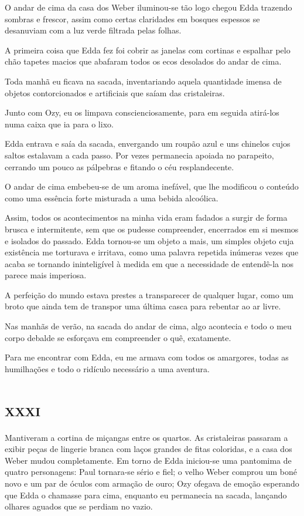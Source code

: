O andar de cima da casa dos Weber iluminou-se tão logo chegou Edda trazendo sombras e frescor, assim como certas claridades em bosques espessos se desanuviam com a luz verde filtrada pelas folhas.

A primeira coisa que Edda fez foi cobrir as janelas com cortinas e espalhar pelo chão tapetes macios que abafaram todos os ecos desolados do andar de cima.

Toda manhã eu ficava na sacada, inventariando aquela quantidade imensa de objetos contorcionados e artificiais que saíam das cristaleiras.

Junto com Ozy, eu os limpava conscienciosamente, para em seguida atirá-los numa caixa que ia para o lixo.

Edda entrava e saía da sacada, envergando um roupão azul e uns chinelos cujos saltos estalavam a cada passo. Por vezes permanecia apoiada no parapeito, cerrando um pouco as pálpebras e fitando o céu resplandecente.

O andar de cima embebeu-se de um aroma inefável, que lhe modificou o conteúdo como uma essência forte misturada a uma bebida alcoólica.

Assim, todos os acontecimentos na minha vida eram fadados a surgir de forma brusca e intermitente, sem que os pudesse compreender, encerrados em si mesmos e isolados do passado. Edda tornou-se um objeto a mais, um simples objeto cuja existência me torturava e irritava, como uma palavra repetida inúmeras vezes que acaba se tornando ininteligível à medida em que a necessidade de entendê-la nos parece mais imperiosa.

A perfeição do mundo estava prestes a transparecer de qualquer lugar, como um broto que ainda tem de transpor uma última casca para rebentar ao ar livre.

Nas manhãs de verão, na sacada do andar de cima, algo acontecia e todo o meu corpo debalde se esforçava em compreender o quê, exatamente.

Para me encontrar com Edda, eu me armava com todos os amargores, todas as humilhações e todo o ridículo necessário a uma aventura.


\chapter*{\huge\centering\textsc{xxxi}}

Mantiveram a cortina de miçangas entre os quartos. As cristaleiras passaram a exibir peças de lingerie branca com laços grandes de fitas coloridas, e a casa dos Weber mudou completamente. Em torno de Edda iniciou-se uma pantomima de quatro personagens: Paul tornara-se sério e fiel; o velho Weber comprou um boné novo e um par de óculos com armação de ouro; Ozy ofegava de emoção esperando que Edda o chamasse para cima, enquanto eu permanecia na sacada, lançando olhares aguados que se perdiam no vazio.


